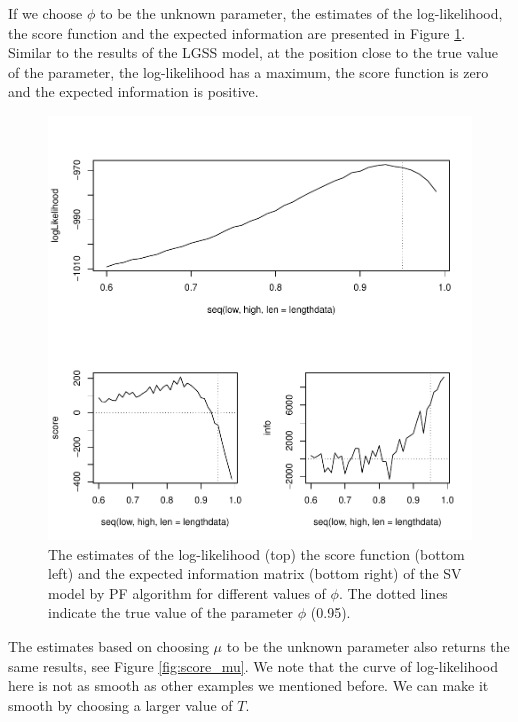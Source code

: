 \documentclass[mstat,12pt]{unswthesis}  %
\numberwithin{equation}{section}
\begin{document}
\noindent If we choose $\phi$ to be the unknown parameter, the estimates
of the log-likelihood, the score function and the expected information
are presented in Figure \ref{fig:score_phi}. Similar to the results of the LGSS model, at the position close to the true value of the parameter, the  log-likelihood
has a maximum, the score function is zero and the expected information is positive.

\begin{figure}[H]
    \centering
    \includegraphics[width=1.0\linewidth]{score_phi.pdf}
    \caption
    {The estimates of the log-likelihood (top) the score
    function (bottom left) and the expected information matrix (bottom right) of the
    SV model by PF algorithm for different values of $\phi$. The dotted lines indicate the true value of the parameter $\phi$ (0.95).}
    \label{fig:score_phi}
\end{figure}

\noindent  The estimates based on choosing $\mu$ to be the unknown parameter also returns the same results, see Figure \ref{fig:score_mu}.
We note that the curve of log-likelihood  here is not as smooth as other examples we mentioned before. We can make it smooth by choosing a larger value of $T$.
\end{document}
